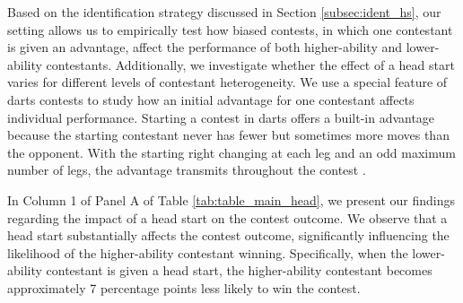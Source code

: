 \documentclass[11pt,a4paper]{article}
\begin{document}
Based on the identification strategy discussed in Section \ref{subsec:ident_hs}, our setting allows us to empirically test how biased contests, in which one contestant is given an advantage, affect the performance of both higher-ability and lower-ability contestants. Additionally, we investigate whether the effect of a head start varies for different levels of contestant heterogeneity. We use a special feature of darts contests to study how an initial advantage for one contestant affects individual performance. Starting a contest in darts offers a built-in advantage because the starting contestant never has fewer but sometimes more moves than the opponent. With the starting right changing at each leg and an odd maximum number of legs, the advantage transmits throughout the contest \cite{Goller.2023}.\par

In Column 1 of Panel A of Table \ref{tab:table_main_head}, we present our findings regarding the impact of a head start on the contest outcome. We observe that a head start substantially affects the contest outcome, significantly influencing the likelihood of the higher-ability contestant winning. Specifically, when the lower-ability contestant is given a head start, the higher-ability contestant becomes approximately 7 percentage points less likely to win the contest.\par
\end{document}
